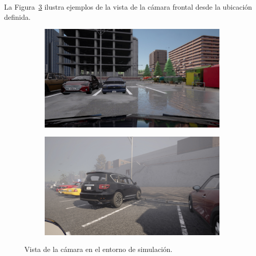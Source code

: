La Figura~\ref{fig:camera-view} ilustra ejemplos de la vista de la cámara frontal desde la ubicación definida.

\begin{figure}[!ht]
    \centering
    \begin{subfigure}{0.4\textwidth}
        \includegraphics[width=\textwidth]{img/mirrow_camara_ex}\label {fig:camara}
    \end{subfigure}
    \begin{subfigure}{0.4\textwidth}
        \includegraphics[width=\textwidth]{img/mirrow_camara_ex2}\label {fig:camara2}
    \end{subfigure}
    \caption{Vista de la cámara en el entorno de simulación.}
    \label{fig:camera-view}
\end{figure}




